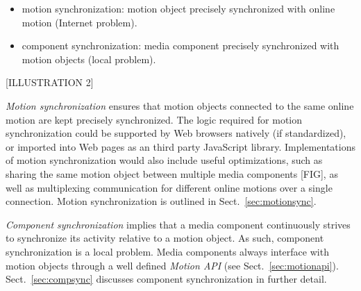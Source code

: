 \begin{itemize}
\item{motion synchronization: motion object precisely synchronized with online motion (Internet problem).}
\item{component synchronization: media component precisely synchronized with motion objects (local problem).} 
\end{itemize}

[ILLUSTRATION 2]

\emph{Motion synchronization} ensures that motion objects connected to the same
online motion are kept precisely synchronized. The logic required for motion
synchronization could be supported by Web browsers natively (if standardized),
or imported into Web pages as an third party JavaScript library.
Implementations of motion synchronization would also include useful
optimizations, such as sharing the same motion object between multiple media
components [FIG], as well as multiplexing communication for different
online motions over a single connection. Motion synchronization is outlined in
Sect.~\ref{sec:motionsync}.

\emph{Component synchronization} implies that a media component continuously strives
to synchronize its activity relative to a motion object. As such, component
synchronization is a local problem. Media components always interface with
motion objects through a well defined \emph{Motion API} (see Sect.~\ref{sec:motionapi}).
Sect.~\ref{sec:compsync} discusses component synchronization in
further detail.
